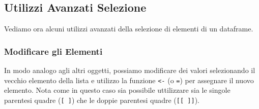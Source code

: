 \documentclass[
]{book}
\newenvironment{Shaded}{\begin{snugshade}}{\end{snugshade}}
\newcommand{\CommentTok}[1]{\textcolor[rgb]{0.56,0.35,0.01}{\textit{#1}}}
\newcommand{\DecValTok}[1]{\textcolor[rgb]{0.00,0.00,0.81}{#1}}
\newcommand{\NormalTok}[1]{#1}
\newcommand{\StringTok}[1]{\textcolor[rgb]{0.31,0.60,0.02}{#1}}
\begin{document}
\hypertarget{utilizzi-avanzati-selezione-1}{%
\subsection{Utilizzi Avanzati Selezione}\label{utilizzi-avanzati-selezione-1}}

Vediamo ora alcuni utilizzi avanzati della selezione di elementi di un dataframe.

\hypertarget{modificare-gli-elementi-3}{%
\subsubsection*{Modificare gli Elementi}\label{modificare-gli-elementi-3}}

In modo analogo agli altri oggetti, possiamo modificare dei valori selezionando il vecchio elemento della lista e utilizzo la funzione \texttt{\textless{}-} (o \texttt{=}) per assegnare il nuovo elemento. Nota come in questo caso sia possibile uttilizzare sia le singole parentesi quadre (\texttt{{[}\ {]}}) che le doppie parentesi quadre (\texttt{{[}{[}\ {]}{]}}).

\begin{Shaded}
\end{Shaded}
\end{document}
